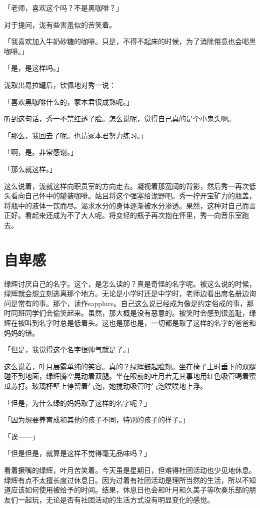 \documentclass[UTF8]{ctexart}
\begin{document}
    「老师，喜欢这个吗？不是黑咖啡？」



    对于提问，泷有些害羞似的苦笑着。

    「我喜欢加入牛奶砂糖的咖啡。只是，不得不起床的时候，为了消除倦意也会喝黑咖啡。」

    「是，是这样吗。」

    泷取出易拉罐后，钦佩地对秀一说：

    「喜欢黑咖啡什么的，冢本君很成熟呢。」

    听到这句话，秀一不禁红透了脸。怎么说呢，觉得自己真的是个小鬼头啊。

    「那么，我回去了呢。也请冢本君努力练习。」

    「啊，是。非常感谢。」

    「那么就这样。」

    这么说着，泷就这样向职员室的方向走去。凝视着那宽阔的背影，然后秀一再次低头看向自己怀中的罐装咖啡。姑且将这个强塞给泷野吧。秀一拧开宝矿力的瓶盖，将瓶中的液体一饮而尽。渴求水分的身体逐渐被水分渗透。果然，这种对自己而言正好。看起来还成为不了大人呢。将变轻的瓶子再次抱在怀里，秀一向音乐室跑去。
    \section{自卑感}
    绿辉讨厌自己的名字。这个，是怎么读的？真是奇怪的名字呢。被这么说的时候，绿辉就会想立刻逃离那个地方。无论是小学时还是中学时，老师边看出席名册边询问是常有的事。那个，读作sapphire。自己这么说已经成为像是约定俗成的事，那时同班同学们会偷笑起来。虽然，那大概是没有恶意的。被笑时会感到很羞耻，绿辉在被叫到名字时总是低着头。这也是那也是，一切都是取了这样的名字的爸爸和妈妈的错。

    「但是，我觉得这个名字很帅气就是了。」

    这么说着，叶月展露单纯的笑容。真的？绿辉鼓起脸颊。坐在椅子上时垂下的双腿碰不到地面，绿辉腾空晃动着双腿。坐在眼前的叶月若无其事地用红色吸管喝着蜜瓜苏打。玻璃杯壁上停留着气泡，她搅动吸管时气泡噗噗地上浮。

    「但是，为什么绿的妈妈取了这样的名字呢？」

    「因为想要养育成和其他的孩子不同，特别的孩子的样子。」

    「诶——」

    「但是但是，就算是这样不觉得毫无品味吗？」

    看着撅嘴的绿辉，叶月苦笑着。今天虽是星期日，但难得社团活动也少见地休息。绿辉有点不太擅长度过休息日。因为过着有社团活动是理所当然的生活，所以不知道应该如何使用被给予的时间。结果，休息日也会和叶月和久美子等吹奏乐部的朋友们一起玩，无论是否有社团活动的生活方式没有明显变化的感觉。
\end{document}
